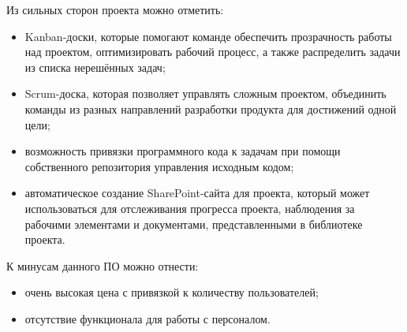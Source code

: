 Из сильных сторон проекта можно отметить:
\begin{itemize}
    \item Kanban-доски, которые помогают команде обеспечить прозрачность работы над проектом, оптимизировать рабочий процесс, а также распределить задачи из списка нерешённых задач;
    \item Scrum-доска, которая позволяет управлять сложным проектом, объединить команды из разных направлений разработки продукта для достижений одной цели;
    \item возможность привязки программного кода к задачам при помощи собственного репозитория управления исходным кодом;
    \item автоматическое создание SharePoint-сайта для проекта, который может использоваться для отслеживания прогресса проекта, наблюдения за рабочими элементами и документами, представленными в библиотеке проекта.
\end{itemize}

К минусам данного ПО можно отнести:
\begin{itemize}
    \item очень высокая цена с привязкой к количеству пользователей;
    \item отсутствие функционала для работы с персоналом.
\end{itemize}
